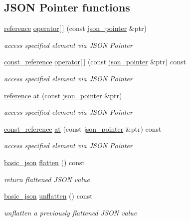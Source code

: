 \subsection*{J\+S\+ON Pointer functions}
\begin{DoxyCompactItemize}
\item 
\hyperlink{classnlohmann_1_1basic__json_a3ec8e17be8732fe436e9d6733f52b7a3}{reference} \hyperlink{classnlohmann_1_1basic__json_a7605b20debcc12fc44bd9f2075122a87}{operator\mbox{[}$\,$\mbox{]}} (const \hyperlink{classnlohmann_1_1basic__json_1_1json__pointer}{json\+\_\+pointer} \&ptr)
\begin{DoxyCompactList}\small\item\em access specified element via J\+S\+ON Pointer \end{DoxyCompactList}\item 
\hyperlink{classnlohmann_1_1basic__json_af677a29b0e66edc9f66e5167e4667071}{const\+\_\+reference} \hyperlink{classnlohmann_1_1basic__json_a1eb1a32bfce21629e64a510d945e01c5}{operator\mbox{[}$\,$\mbox{]}} (const \hyperlink{classnlohmann_1_1basic__json_1_1json__pointer}{json\+\_\+pointer} \&ptr) const
\begin{DoxyCompactList}\small\item\em access specified element via J\+S\+ON Pointer \end{DoxyCompactList}\item 
\hyperlink{classnlohmann_1_1basic__json_a3ec8e17be8732fe436e9d6733f52b7a3}{reference} \hyperlink{classnlohmann_1_1basic__json_a649aef71e5d952499da7ad3b8e7c9236}{at} (const \hyperlink{classnlohmann_1_1basic__json_1_1json__pointer}{json\+\_\+pointer} \&ptr)
\begin{DoxyCompactList}\small\item\em access specified element via J\+S\+ON Pointer \end{DoxyCompactList}\item 
\hyperlink{classnlohmann_1_1basic__json_af677a29b0e66edc9f66e5167e4667071}{const\+\_\+reference} \hyperlink{classnlohmann_1_1basic__json_a8faa955d51ec1f63b9ea9a7cc1eb93e8}{at} (const \hyperlink{classnlohmann_1_1basic__json_1_1json__pointer}{json\+\_\+pointer} \&ptr) const
\begin{DoxyCompactList}\small\item\em access specified element via J\+S\+ON Pointer \end{DoxyCompactList}\item 
\hyperlink{classnlohmann_1_1basic__json}{basic\+\_\+json} \hyperlink{classnlohmann_1_1basic__json_a54d58e56e8a67aaf0c2f3a3a05a76bba}{flatten} () const
\begin{DoxyCompactList}\small\item\em return flattened J\+S\+ON value \end{DoxyCompactList}\item 
\hyperlink{classnlohmann_1_1basic__json}{basic\+\_\+json} \hyperlink{classnlohmann_1_1basic__json_abc459edfac71c4ecc9347731f722026b}{unflatten} () const
\begin{DoxyCompactList}\small\item\em unflatten a previously flattened J\+S\+ON value \end{DoxyCompactList}\end{DoxyCompactItemize}
